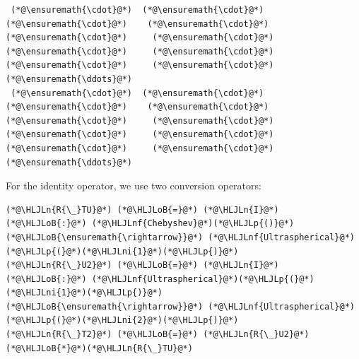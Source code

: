 \documentclass[12pt,a4paper]{article}
\newcommand{\HLJLn}[1]{#1}
\newcommand{\HLJLnf}[1]{\textcolor[RGB]{66,102,213}{#1}}
\newcommand{\HLJLni}[1]{\textcolor[RGB]{59,151,46}{#1}}
\newcommand{\HLJLoB}[1]{\textcolor[RGB]{102,102,102}{\textbf{#1}}}
\newcommand{\HLJLp}[1]{#1}
\begin{document}
\begin{lstlisting}
 (*@\ensuremath{\cdot}@*)  (*@\ensuremath{\cdot}@*)   (*@\ensuremath{\cdot}@*)    (*@\ensuremath{\cdot}@*)    (*@\ensuremath{\cdot}@*)     (*@\ensuremath{\cdot}@*)     (*@\ensuremath{\cdot}@*)     (*@\ensuremath{\cdot}@*)     (*@\ensuremath{\cdot}@*)     (*@\ensuremath{\cdot}@*)   (*@\ensuremath{\ddots}@*)
 (*@\ensuremath{\cdot}@*)  (*@\ensuremath{\cdot}@*)   (*@\ensuremath{\cdot}@*)    (*@\ensuremath{\cdot}@*)    (*@\ensuremath{\cdot}@*)     (*@\ensuremath{\cdot}@*)     (*@\ensuremath{\cdot}@*)     (*@\ensuremath{\cdot}@*)     (*@\ensuremath{\cdot}@*)     (*@\ensuremath{\cdot}@*)   (*@\ensuremath{\ddots}@*)
\end{lstlisting}


For the identity operator, we use two conversion operators:


\begin{lstlisting}
(*@\HLJLn{R{\_}TU}@*) (*@\HLJLoB{=}@*) (*@\HLJLn{I}@*) (*@\HLJLoB{:}@*) (*@\HLJLnf{Chebyshev}@*)(*@\HLJLp{()}@*) (*@\HLJLoB{\ensuremath{\rightarrow}}@*) (*@\HLJLnf{Ultraspherical}@*)(*@\HLJLp{(}@*)(*@\HLJLni{1}@*)(*@\HLJLp{)}@*)
(*@\HLJLn{R{\_}U2}@*) (*@\HLJLoB{=}@*) (*@\HLJLn{I}@*) (*@\HLJLoB{:}@*) (*@\HLJLnf{Ultraspherical}@*)(*@\HLJLp{(}@*)(*@\HLJLni{1}@*)(*@\HLJLp{)}@*) (*@\HLJLoB{\ensuremath{\rightarrow}}@*) (*@\HLJLnf{Ultraspherical}@*)(*@\HLJLp{(}@*)(*@\HLJLni{2}@*)(*@\HLJLp{)}@*)
(*@\HLJLn{R{\_}T2}@*) (*@\HLJLoB{=}@*) (*@\HLJLn{R{\_}U2}@*)(*@\HLJLoB{*}@*)(*@\HLJLn{R{\_}TU}@*)
\end{lstlisting}
\end{document}

